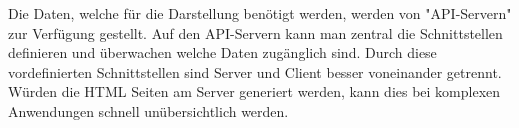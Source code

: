 Die Daten, welche für die Darstellung benötigt werden, werden von "API-Servern" zur Verfügung gestellt. Auf den API-Servern kann man zentral die Schnittstellen definieren und überwachen welche Daten zugänglich sind. Durch diese vordefinierten Schnittstellen sind Server und Client besser voneinander getrennt. Würden die HTML Seiten am Server generiert werden, kann dies bei komplexen Anwendungen schnell unübersichtlich werden.

